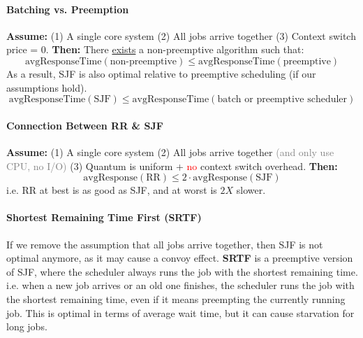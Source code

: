 \documentclass[openany,12pt]{book}
\newcommand{\red}[1]{\textcolor{Red}{#1}}
\newcommand{\gray}[1]{\textcolor{gray}{#1}}
\begin{document}
\begin{samepage}
  \paragraph{Batching vs. Preemption} \textbf{Assume:} (1) A single core system (2) All jobs arrive together (3) Context switch price = 0. \textbf{Then:} There \ul{exists} a non-preemptive algorithm such that:
  \begin{equation*}
    \text{avgResponseTime}(\text{non-preemptive}) \leq \text{avgResponseTime}(\text{preemptive})
  \end{equation*}
  As a result, SJF is also optimal relative to preemptive scheduling (if our assumptions hold).
  \begin{equation*}
    \text{avgResponseTime}(\text{SJF}) \leq \text{avgResponseTime}(\text{batch or preemptive scheduler})
  \end{equation*}
\end{samepage}


\paragraph{Connection Between RR \& SJF} \textbf{Assume:} (1) A single core system (2) All jobs arrive together \gray{(and only use CPU, no I/O)} (3) Quantum is uniform + \red{no} context switch overhead. \textbf{Then:}
\begin{equation*}
  \text{avgResponse}(\text{RR}) \leq 2\cdot \text{avgResponse}(\text{SJF})
\end{equation*}
i.e. RR at best is as good as SJF, and at worst is \(2X\) slower.


\paragraph{Shortest Remaining Time First (SRTF)} If we remove the assumption that all jobs arrive together, then SJF is not optimal anymore, as it may cause a convoy effect. \textbf{SRTF} is a preemptive version of SJF, where the scheduler always runs the job with the shortest remaining time. i.e. when a new job arrives or an old one finishes, the scheduler runs the job with the shortest remaining time, even if it means preempting the currently running job. This is optimal in terms of average wait time, but it can cause starvation for long jobs.
\end{document}
